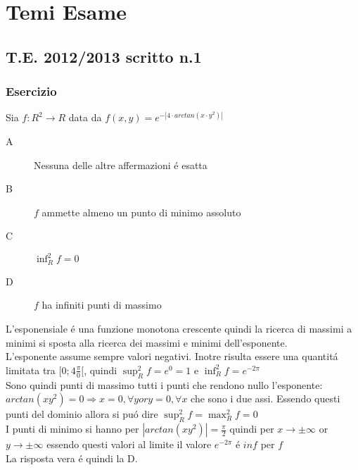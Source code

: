 \part{Temi Esame}

\chapter{T.E. 2012/2013 scritto n.1}
\section{Esercizio}
Sia $f: R^2 \rightarrow R$ data da $f(x, y)=e^{-|4\cdot arctan(x\cdot y^2)|}$
\begin{description}
	\item[A] Nessuna delle altre affermazioni \'e esatta
	\item[B] $f$ ammette almeno un punto di minimo assoluto
	\item[C] $\inf_R^2f = 0$
	\item[D] $f$ ha infiniti punti di massimo
\end{description}
L'esponensiale \'e una funzione monotona crescente quindi la ricerca di massimi a minimi si sposta alla ricerca dei massimi e minimi dell'esponente.\\
L'esponente assume sempre valori negativi. Inotre risulta essere una quantit\'a limitata tra $[0;4\frac{\pi}{0}[$, quindi $\sup_R^2f=e^0=1$ e $\inf_R^2f=e^{-2\pi}$\\
Sono quindi punti di massimo tutti i punti che rendono nullo l'esponente: $arctan(xy^2)=0\Rightarrow x=0,\forall y or y=0,\forall x$ che sono i due assi. Essendo questi punti del dominio allora si pu\'o dire $\sup_R^2f=\max_R^2f=0$\\
I punti di minimo si hanno per $|arctan(xy^2)|=\frac{\pi}{2}$ quindi per $x\rightarrow \pm\infty$ or $y\rightarrow \pm\infty$ essendo questi valori al limite il valore $e^{-2\pi}$ \'e $inf$ per $f$\\
La risposta vera \'e quindi la D.\\
